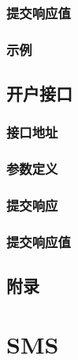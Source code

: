 \documentclass[11pt]{book} %
\begin{document}
\section{提交响应值}
\section{示例}
\chapter{开户接口}
\section{接口地址}
\section{参数定义}
\section{提交响应}
\section{提交响应值}
\chapter{附录}


\part{SMS}
\end{document}
